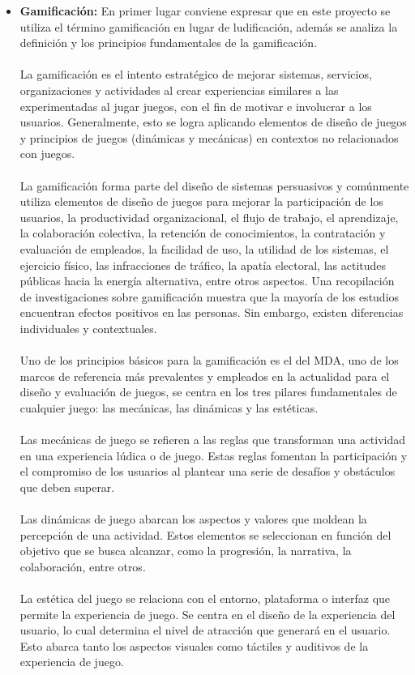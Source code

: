 \begin{itemize}
    \item \textbf{Gamificación:} En primer lugar conviene expresar que en este proyecto  se utiliza el término gamificación en lugar de ludificación, además se analiza la definición y los principios fundamentales de la gamificación.
    \\ \\
La gamificación es el intento estratégico de mejorar sistemas, servicios, organizaciones y actividades al crear experiencias similares a las experimentadas al jugar juegos, con el fin de motivar e involucrar a los usuarios. Generalmente, esto se logra aplicando elementos de diseño de juegos y principios de juegos (dinámicas y mecánicas) en contextos no relacionados con juegos.\cite{g}
\\ \\
La gamificación forma parte del diseño de sistemas persuasivos y comúnmente utiliza elementos de diseño de juegos para mejorar la participación de los usuarios, la productividad organizacional, el flujo de trabajo, el aprendizaje, la colaboración colectiva, la retención de conocimientos, la contratación y evaluación de empleados, la facilidad de uso, la utilidad de los sistemas, el ejercicio físico, las infracciones de tráfico, la apatía electoral, las actitudes públicas hacia la energía alternativa, entre otros aspectos. Una recopilación de investigaciones sobre gamificación muestra que la mayoría de los estudios encuentran efectos positivos en las personas. Sin embargo, existen diferencias individuales y contextuales.
\\ \\
Uno de los principios básicos para la gamificación es el del MDA, uno de los marcos de referencia más prevalentes y empleados en la actualidad para el diseño y evaluación de juegos, se centra en los tres pilares fundamentales de cualquier juego: las mecánicas, las dinámicas y las estéticas.
\\ \\
Las mecánicas de juego se refieren a las reglas que transforman una actividad en una experiencia lúdica o de juego. Estas reglas fomentan la participación y el compromiso de los usuarios al plantear una serie de desafíos y obstáculos que deben superar.
\\ \\
Las dinámicas de juego abarcan los aspectos y valores que moldean la percepción de una actividad. Estos elementos se seleccionan en función del objetivo que se busca alcanzar, como la progresión, la narrativa, la colaboración, entre otros.
\\ \\
La estética del juego se relaciona con el entorno, plataforma o interfaz que permite la experiencia de juego. Se centra en el diseño de la experiencia del usuario, lo cual determina el nivel de atracción que generará en el usuario. Esto abarca tanto los aspectos visuales como táctiles y auditivos de la experiencia de juego.


\end{itemize}
